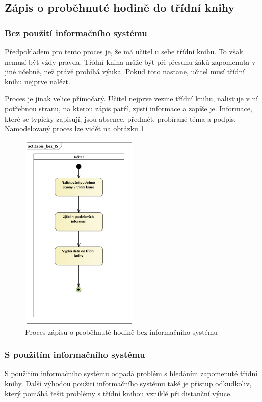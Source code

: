 \subsection{Zápis o proběhnuté hodině do třídní knihy}
\subsubsection*{Bez použití informačního systému}
Předpokladem pro tento proces je, že má učitel u sebe třídní knihu. To však nemusí být vždy pravda. Třídní kniha může být při přesunu žáků zapomenuta v jiné učebně, než právě probíhá výuka. Pokud toto nastane, učitel musí třídní knihu nejprve nalézt.

Proces je jinak velice přímočarý. Učitel nejprve vezme třídní knihu, nalistuje v ní potřebnou stranu, na kterou zápis patří, zjistí informace a zapíše je. Informace, které se typicky zapisují, jsou absence, předmět, probírané téma a podpis. Namodelovaný proces lze vidět na obrázku \ref{zapis_bez_IS}.

\begin{figure}[h]
	\centering
	\includegraphics[width=0.5\textwidth]{images/Zapis_bez_IS.png}
	\caption{Proces zápisu o proběhnuté hodině bez informačního systému}
	\label{zapis_bez_IS}
\end{figure}

\subsubsection*{S použitím informačního systému}
S použitím informačního systému odpadá problém s hledáním zapomenuté třídní knihy. Další výhodou použití informačního systému také je přístup odkudkoliv, který pomáhá řešit problémy s třídní knihou vzniklé při distanční výuce.

